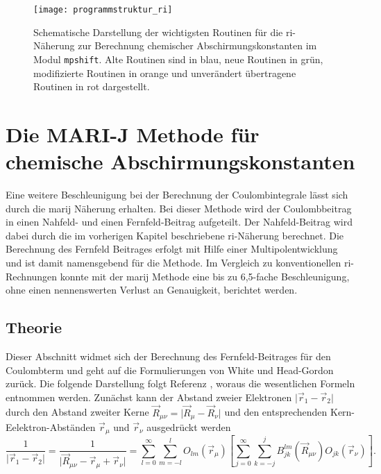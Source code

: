 \begin{figure}[ht!]
\centering
\texttt{[image: programmstruktur\_ri]}
\captionsetup{figurewithin = chapter}
\captionsetup{font=small, labelfont=bf}\caption[\ac{ri}-J Routinen für chemische Abschirmungskonstanten]{Schematische Darstellung der wichtigsten Routinen für die \ac{ri}-Näherung zur Berechnung chemischer Abschirmungskonstanten im Modul \texttt{mpshift}. Alte Routinen sind in blau, neue Routinen in grün, modifizierte Routinen in orange und unverändert übertragene Routinen in rot dargestellt.}
\label{abb:programmstrukur_ri}
\end{figure}

\section{Die MARI-J Methode für chemische Abschirmungskonstanten}\label{marij}
Eine weitere Beschleunigung bei der Berechnung der Coulombintegrale lässt sich durch die \acf{marij} Näherung erhalten. Bei dieser Methode wird der Coulombbeitrag in einen Nahfeld- und einen Fernfeld-Beitrag aufgeteilt. Der Nahfeld-Beitrag wird dabei durch die im vorherigen Kapitel beschriebene \ac{ri}-Näherung berechnet. Die Berechnung des Fernfeld Beitrages erfolgt mit Hilfe einer Multipolentwicklung und ist damit namensgebend für die Methode. Im Vergleich zu konventionellen \ac{ri}-Rechnungen konnte mit der \ac{marij} Methode eine bis zu 6,5-fache Beschleunigung, ohne einen nennenswerten Verlust an Genauigkeit, berichtet werden.\supercite{sierka2003fast}

	\subsection{Theorie}
	Dieser Abschnitt widmet sich der Berechnung des Fernfeld-Beitrages für den Coulombterm und geht auf die Formulierungen von White und Head-Gordon\supercite{white1994derivation} zurück. Die folgende Darstellung folgt Referenz \cite{sierka2003fast}, woraus die wesentlichen Formeln entnommen werden. Zunächst kann der Abstand zweier Elektronen $\vert\vec{r}_1-\vec{r}_2\vert$ durch den Abstand zweiter Kerne $\vec{R}_{\mu\nu}=\vert\vec{R}_\mu-\vec{R}_\nu\vert$ und den entsprechenden Kern-Eelektron-Abständen $\vec{r}_\mu$ und $\vec{r}_\nu$ ausgedrückt werden
	\begin{equation}
	\frac{1}{\vert\vec{r}_1-\vec{r}_2\vert}=\frac{1}{\vert\vec{R}_{\mu\nu}-\vec{r}_\mu+\vec{r}_\nu\vert}=\sum_{l=0}^{\infty}\sum_{m=-l}^l O_{lm}(\vec{r}_\mu)\left[\sum_{j=0}^{\infty}\sum_{k=-j}^jB_{jk}^{lm}(\vec{R}_{\mu\nu})O_{jk}(\vec{r}_\nu)\right].
	\end{equation}
	
